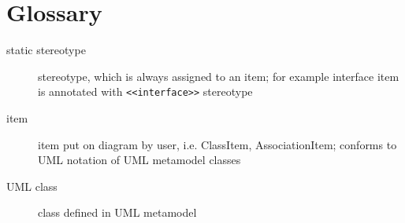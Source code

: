 \documentclass[draft]{book}
\newcommand{\rstereotype}[1]{\texttt{<<#1>>}}
\begin{document}
\chapter{Glossary}

\begin{description}
\item[static stereotype] stereotype, which is always assigned
    to an item; for example interface item is annotated with
    \rstereotype{interface} stereotype

\item[item] item put on diagram by user, i.e. ClassItem, AssociationItem;
    conforms to UML notation of UML metamodel classes

\item[UML class] class defined in UML metamodel
\end{description}
\end{document}
